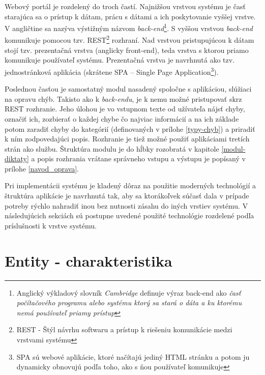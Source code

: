 \documentclass[12pt,oneside]{fithesis2}
\begin{document}
    \par Webový portál je rozdelený do troch častí. Najnižšou vrstvou systému je časť starajúca sa o prístup k dátam, prácu s dátami a ich poskytovanie vyššej vrstve. V angličtine sa nazýva výstižným názvom \textit{back-end}\footnote{Anglický výkladový slovník \textit{Cambridge} definuje výraz back-end ako \textit{časť počítačového programu alebo systému ktorý sa stará o dáta a ku ktorému nemá používateľ priamy prístup}}. S vyššou vrstvou \textit{back-end} komunikuje pomocou tzv. REST\footnote{REST - Štýl návrhu softwaru a prístup k riešeniu komunikácie medzi vrstvami systému} rozhraní. Nad vrstvou pristupujúcou k dátam stojí tzv. prezentačná vrstva (anglicky front-end), teda vrstva s ktorou priamo komunikuje používateľ systému. Prezentačná vrstva je navrhnutá ako tzv. jednostránková aplikácia (skrátene SPA -- Single Page Application\footnote{SPA sú webové aplikácie, ktoré načítajú jediný HTML stránku a potom ju dynamicky obnovujú podľa toho, ako s ňou používateľ komunikuje\cite{wasson13}}). 
	    \par Poslednou časťou je samostatný modul nasadený spoločne s aplikáciou, slúžiaci na opravu chýb. Takisto ako k \textit{back-endu}, je k nemu možné pristupovať skrz REST rozhranie. Jeho úlohou je vo vstupnom texte od užívateľa nájsť chyby, označiť ich, zozbierať o každej chybe čo najviac informácií a na ich základe potom zaradiť chyby do kategórií (definovaných v prílohe \ref{typy-chyb}) a priradiť k ním zodpovedajúci popis. Rozhranie je tiež možné použiť aplikáciami tretích strán ako službu. Štruktúra modulu je do hĺbky rozobratá v kapitole \ref{modul-diktaty} a popis rozhrania vrátane správneho vstupu a výstupu je popísaný v prílohe \ref{navod_oprava}.
	    \par Pri implementácii systému je kladený dôraz na použitie moderných technológií a štruktúra aplikácie je navrhnutá tak, aby sa ktorákoľvek súčasť dala v prípade potreby rýchlo nahradiť inou bez nutnosti zásahu do iných vrstiev systému. V následujúcich sekciách sú postupne uvedené použité technológie rozdelené podľa príslušnosti k vrstve systému.
	\pagebreak
		
	\section{Entity - charakteristika} \label{entity}
\end{document}
